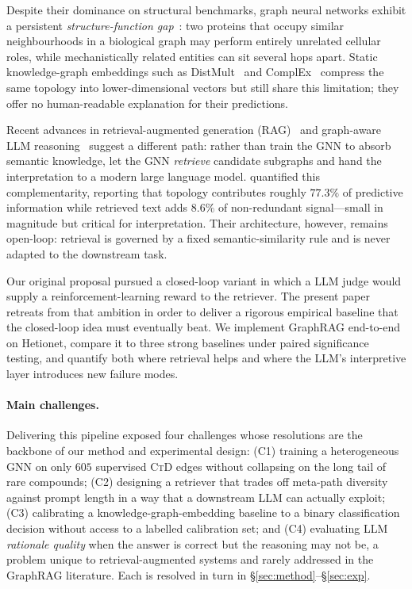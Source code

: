 \documentclass{article}
\newcommand{\ctd}{\textsc{CtD}\xspace}
\begin{document}
Despite their dominance on structural benchmarks, graph neural networks exhibit a persistent \emph{structure-function gap}~\citep{zitnik2018decagon}: two proteins that occupy similar neighbourhoods in a biological graph may perform entirely unrelated cellular roles, while mechanistically related entities can sit several hops apart. Static knowledge-graph embeddings such as DistMult~\citep{yang2015distmult} and ComplEx~\citep{trouillon2016complex} compress the same topology into lower-dimensional vectors but still share this limitation; they offer no human-readable explanation for their predictions.

Recent advances in retrieval-augmented generation (RAG)~\citep{lewis2020rag} and graph-aware LLM reasoning~\citep{mavromatis2024gnnrag,sun2024tog} suggest a different path: rather than train the GNN to absorb semantic knowledge, let the GNN \emph{retrieve} candidate subgraphs and hand the interpretation to a modern large language model. \citet{hays2026raggnn} quantified this complementarity, reporting that topology contributes roughly $77.3\%$ of predictive information while retrieved text adds $8.6\%$ of non-redundant signal---small in magnitude but critical for interpretation. Their architecture, however, remains open-loop: retrieval is governed by a fixed semantic-similarity rule and is never adapted to the downstream task.

Our original proposal pursued a closed-loop variant in which a LLM judge would supply a reinforcement-learning reward to the retriever. The present paper retreats from that ambition in order to deliver a rigorous empirical baseline that the closed-loop idea must eventually beat. We implement GraphRAG end-to-end on Hetionet, compare it to three strong baselines under paired significance testing, and quantify both where retrieval helps and where the LLM's interpretive layer introduces new failure modes.

\paragraph{Main challenges.}
Delivering this pipeline exposed four challenges whose resolutions are the backbone of our method and experimental design: (C1) training a heterogeneous GNN on only $605$ supervised \ctd edges without collapsing on the long tail of rare compounds; (C2) designing a retriever that trades off meta-path diversity against prompt length in a way that a downstream LLM can actually exploit; (C3) calibrating a knowledge-graph-embedding baseline to a binary classification decision without access to a labelled calibration set; and (C4) evaluating LLM \emph{rationale quality} when the answer is correct but the reasoning may not be, a problem unique to retrieval-augmented systems and rarely addressed in the GraphRAG literature. Each is resolved in turn in \S\ref{sec:method}--\S\ref{sec:exp}.
\end{document}
